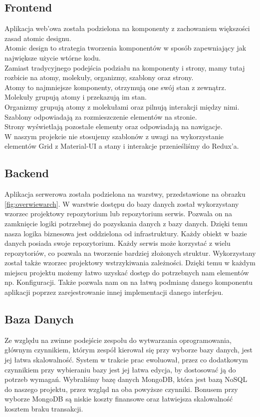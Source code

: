 \documentclass[a4paper,11pt]{report}
\begin{document}
\subsection{Frontend}
Aplikacja web'owa została podzielona na komponenty z zachowaniem większości zasad atomic designu.\\
Atomic design to strategia tworzenia komponentów w sposób zapewniający jak największe użycie wtórne kodu.\\
Zamiast tradycyjnego podejścia podziału na komponenty i strony, mamy tutaj rozbicie na atomy, molekuły, organizmy, szablony oraz strony.\\
Atomy to najmniejsze komponenty, otrzymują one swój stan z zewnątrz.\\
Molekuły grupują atomy i przekazują im stan.\\
Organizmy grupują atomy z molekułami oraz pilnują interakcji między nimi.\\
Szablony odpowiadają za rozmieszczenie elementów na stronie.\\
Strony wyświetlają pozostałe elementy oraz odpowiadają na nawigacje.\\
W naszym projekcie nie stosujemy szablonów z uwagi na wykorzystanie elementów Grid z Material-UI a stany i interakcje przenieśliśmy do Redux'a.\\

\subsection{Backend}
Aplikacja serwerowa została podzielona na warstwy, przedstawione na obrazku \ref{fig:overwiewarch}.
W warstwie dostępu do bazy danych został wykorzystany wzorzec projektowy repozytorium lub repozytorium serwis.
Pozwala on na zamknięcie logiki potrzebnej do pozyskania danych z bazy danych.
Dzięki temu nasza logika biznesowa jest oddzielona od infrastruktury.
Każdy obiekt w bazie danych posiada swoje repozytorium.
Każdy serwis może korzystać z wielu repozytoriów, co pozwala na tworzenie bardziej złożonych struktur.
Wykorzystany został także wzorzec projektowy wstrzykiwania zależności.
Dzięki temu w każdym miejscu projektu możemy łatwo uzyskać dostęp do potrzebnych nam elementów np. Konfiguracji.
Także pozwala nam on na łatwą podmianę danego komponentu aplikacji poprzez zarejestrowanie innej implementacji danego interfejsu.

\subsection{Baza Danych}
Ze względu na zwinne podejście zespołu do wytwarzania oprogramowania, głównym czynnikiem, którym zespół kierował się przy wyborze bazy danych, jest jej łatwa skalowalność.
System w trakcie prac ewoluował, przez co dodatkowym czynnikiem przy wybieraniu bazy jest jej łatwa edycja, by dostosować ją do potrzeb wymagań. 
Wybraliśmy bazę danych MongoDB, która jest bazą NoSQL do naszego projektu, przez wzgląd na oba powyższe czynniki. Bonusem przy wyborze MongoDB są niskie koszty finansowe oraz łatwiejsza skalowalność kosztem braku transakcji.
\end{document}

